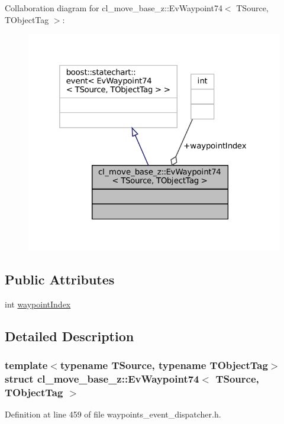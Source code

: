 Collaboration diagram for cl\+\_\+move\+\_\+base\+\_\+z\+:\+:Ev\+Waypoint74$<$ T\+Source, T\+Object\+Tag $>$\+:
\nopagebreak
\begin{figure}[H]
\begin{center}
\leavevmode
\includegraphics[width=319pt]{structcl__move__base__z_1_1EvWaypoint74__coll__graph}
\end{center}
\end{figure}
\subsection*{Public Attributes}
\begin{DoxyCompactItemize}
\item 
int \hyperlink{structcl__move__base__z_1_1EvWaypoint74_a4dff01b1eda8120ae654f9694bb8b3f2}{waypoint\+Index}
\end{DoxyCompactItemize}


\subsection{Detailed Description}
\subsubsection*{template$<$typename T\+Source, typename T\+Object\+Tag$>$\newline
struct cl\+\_\+move\+\_\+base\+\_\+z\+::\+Ev\+Waypoint74$<$ T\+Source, T\+Object\+Tag $>$}



Definition at line 459 of file waypoints\+\_\+event\+\_\+dispatcher.\+h.



